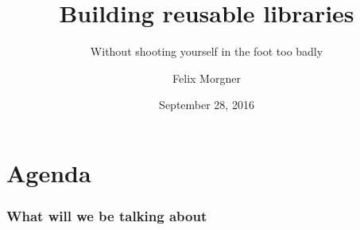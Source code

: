 \documentclass[aspectratio=169,t]{beamer}
\title{Building reusable libraries}
\subtitle{Without shooting yourself in the foot too badly}
\date{September 28, 2016}
\author{Felix Morgner}
\institute[University of Applied Sciences Rapperswil]{Institute for Software\\University of Applied Sciences Rapperswil}
\begin{document}
  \maketitle
  \section*{Agenda}

  \begin{frame}
    \frametitle{What will we be talking about}
    \pause{}
    \tableofcontents
  \end{frame}

  
  
  
  
  
\end{document}
